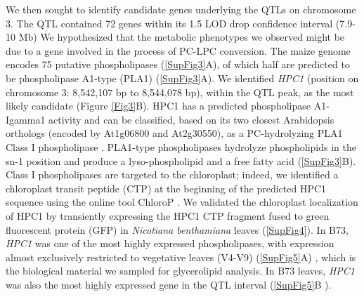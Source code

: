 \documentclass[9pt,twocolumn,twoside,lineno]{biorxiv}
\begin{document}
We then sought to identify candidate genes underlying the QTLs on chromosome 3.
The QTL contained 72 genes within its 1.5 LOD drop confidence interval (7.9-10 Mb) 
We hypothesized that the metabolic phenotypes we observed might be due to a gene involved in the process of PC-LPC conversion.  
The maize genome encodes 75 putative phospholipases (\ref{SupFig3}A), of which half are predicted to be phospholipase A1-type (PLA1) (\ref{SupFig3}A).  
We identified \textit{HPC1} (position on chromosome 3: 8,542,107 bp to 8,544,078 bp), within the QTL peak, as the most likely candidate (Figure \ref{Fig3}B). 
HPC1 has a predicted phospholipase A1-Igamma1 activity and can be classified, based on its two closest Arabidopsis orthologs (encoded by At1g06800 and At2g30550), as a PC-hydrolyzing PLA1 Class I phospholipase \cite{Ryu2004-iv}. 
PLA1-type phospholipases hydrolyze phospholipids in the sn-1 position and produce a lyso-phospholipid and a free fatty acid (\ref{SupFig3}B). 
Class I phospholipases are targeted to the chloroplast; indeed, we identified a chloroplast transit peptide (CTP) at the beginning of the predicted HPC1 sequence using the online tool ChloroP \cite{Emanuelsson1999-rs}.
We validated the chloroplast localization of HPC1 by transiently expressing  the HPC1 CTP fragment fused to green fluorescent protein (GFP) in \textit{Nicotiana benthamiana} leaves (\ref{SupFig4}).
In B73, \textit{HPC1} was one of the most highly expressed phospholipases, with expression almost exclusively restricted to vegetative leaves (V4-V9) (\ref{SupFig5}A) \cite{Stelpflug2016-vr}, which is the biological material we sampled for glycerolipid analysis. 
In B73 leaves, \textit{HPC1} was also the most highly expressed gene in the QTL interval (\ref{SupFig5}B \cite{Stelpflug2016-vr}).
\end{document}
